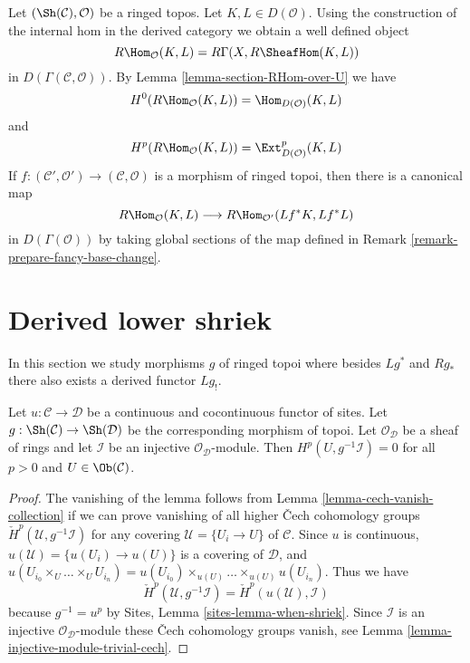 \noindent
Let $(\Sh(\mathcal{C}), \mathcal{O})$ be a ringed topos.
Let $K, L \in D(\mathcal{O})$.
Using the construction of the internal hom in the derived category we
obtain a well defined object
$$
R\Hom_\mathcal{O}(K, L) = R\Gamma(X, R\SheafHom(K, L))
$$
in $D(\Gamma(\mathcal{C}, \mathcal{O}))$. By
Lemma \ref{lemma-section-RHom-over-U} we have
$$
H^0(R\Hom_\mathcal{O}(K, L)) = \Hom_{D(\mathcal{O})}(K, L)
$$
and
$$
H^p(R\Hom_\mathcal{O}(K, L)) = \Ext_{D(\mathcal{O})}^p(K, L)
$$
If $f : (\mathcal{C}', \mathcal{O}') \to (\mathcal{C}, \mathcal{O})$
is a morphism of ringed topoi, then there is a canonical map
$$
R\Hom_\mathcal{O}(K, L) \longrightarrow R\Hom_{\mathcal{O}'}(Lf^*K, Lf^*L)
$$
in $D(\Gamma(\mathcal{O}))$ by taking global sections of the map
defined in Remark \ref{remark-prepare-fancy-base-change}.









\section{Derived lower shriek}
\label{section-derived-lower-shriek}

\noindent
In this section we study morphisms $g$ of ringed topoi where besides
$Lg^*$ and $Rg_*$ there also exists a derived functor $Lg_!$.

\begin{lemma}
\label{lemma-pullback-injective-pre-limp}
Let $u : \mathcal{C} \to \mathcal{D}$ be a continuous and cocontinuous
functor of sites. Let $g : \Sh(\mathcal{C}) \to \Sh(\mathcal{D})$
be the corresponding morphism of topoi. Let $\mathcal{O}_\mathcal{D}$
be a sheaf of rings and let $\mathcal{I}$ be an injective
$\mathcal{O}_\mathcal{D}$-module. Then
$H^p(U, g^{-1}\mathcal{I}) = 0$ for all $p > 0$ and $U \in \Ob(\mathcal{C})$.
\end{lemma}

\begin{proof}
The vanishing of the lemma follows from
Lemma \ref{lemma-cech-vanish-collection}
if we can prove vanishing of all higher
{\v C}ech cohomology groups
$\check H^p(\mathcal{U}, g^{-1}\mathcal{I})$
for any covering $\mathcal{U} = \{U_i \to U\}$ of $\mathcal{C}$.
Since $u$ is continuous, $u(\mathcal{U}) = \{u(U_i) \to u(U)\}$
is a covering of $\mathcal{D}$, and
$u(U_{i_0} \times_U \ldots \times_U U_{i_n}) =
u(U_{i_0}) \times_{u(U)} \ldots \times_{u(U)} u(U_{i_n})$.
Thus we have
$$
\check H^p(\mathcal{U}, g^{-1}\mathcal{I}) =
\check H^p(u(\mathcal{U}), \mathcal{I})
$$
because $g^{-1} = u^p$ by Sites, Lemma \ref{sites-lemma-when-shriek}.
Since $\mathcal{I}$ is an injective
$\mathcal{O}_\mathcal{D}$-module these {\v C}ech cohomology groups vanish, see
Lemma \ref{lemma-injective-module-trivial-cech}.
\end{proof}

